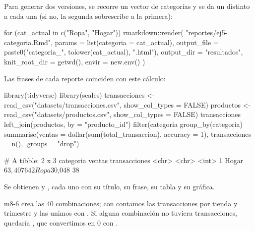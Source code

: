Para generar dos versiones, se recorre un vector de categorías y se da un
 distinto a cada una (si no, la segunda sobrescribe a
la primera):

\begin{rnoejecutar}
for (cat_actual in c("Ropa", "Hogar")) {
  rmarkdown::render(
    "reportes/ej5-categoria.Rmd",
    params        = list(categoria = cat_actual),
    output_file   = paste0("categoria_", tolower(cat_actual), ".html"),
    output_dir    = "resultados",
    knit_root_dir = getwd(),
    envir         = new.env()
  )
}
\end{rnoejecutar}

Las frases de cada reporte coinciden con este cálculo:

\begin{rcode}
library(tidyverse)
library(scales)
transacciones <- read_csv("datasets/transacciones.csv",
                          show_col_types = FALSE)
productos <- read_csv("datasets/productos.csv", show_col_types = FALSE)
transacciones %
  left_join(productos, by = "producto_id") %
  filter(categoria %
  group_by(categoria) %
  summarise(ventas = dollar(sum(total_transaccion), accuracy = 1),
            transacciones = n(), .groups = "drop")
\end{rcode}
\begin{rsalida}
# A tibble: 2 x 3
  categoria ventas  transacciones
  <chr>     <chr>           <int>
1 Hogar     $63,407            64
2 Ropa      $30,048            38
\end{rsalida}

Se obtienen  y
, cada uno con su título, su frase,
su tabla y su gráfica.


\begin{solucion}{m8-6}
 crea las 40 combinaciones; con 
contamos las transacciones por tienda y trimestre y las unimos con
. Si alguna combinación no tuviera transacciones,
quedaría , que convertimos en 0 con .
\end{solucion}

